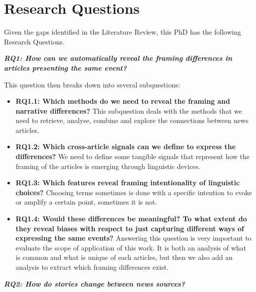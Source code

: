 \chapter{Research Questions}
\label{chap:research_questions}


Given the gaps identified in the Literature Review, this PhD has the following Research Questions.

\vspace{12px}

\textit{\textbf{RQ1: How can we automatically reveal the framing differences in articles presenting the same event?}}

\vspace{12px}

This question then breaks down into several subquestions:

\begin{itemize}
    \item \textbf{RQ1.1: Which methods do we need to reveal the framing and narrative differences?} This subquestion deals with the methods that we need to retrieve, analyse, combine and explore the connections between news articles.
    \item \textbf{RQ1.2: Which cross-article signals can we define to express the differences?} We need to define some tangible signals that represent how the framing of the articles is emerging through linguistic devices.
    \item \textbf{RQ1.3: Which features reveal framing intentionality of linguistic choices?} Choosing terms sometimes is done with a specific intention to evoke or amplify a certain point, sometimes it is not.
    \item \textbf{RQ1.4: Would these differences be meaningful? To what extent do they reveal biases with respect to just capturing different ways of expressing the same events?} Answering this question is very important to evaluate the scope of application of this work. It is both an analysis of what is common and what is unique of each articles, but then we also add an analysis to extract which framing differences exist.   
\end{itemize}


\vspace{12px}

\textit{\textbf{RQ2: How do stories change between news sources?}}

